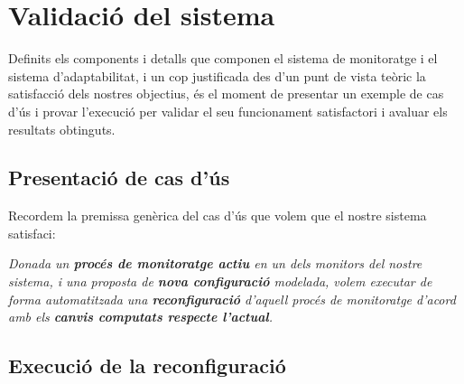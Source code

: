 
\chapter{Validació del sistema} %

Definits els components i detalls que componen el sistema de monitoratge i el sistema d'adaptabilitat, i un cop justificada des d'un punt de vista teòric la satisfacció dels nostres objectius, és el moment de presentar un exemple de cas d'ús i provar l'execució per validar el seu funcionament satisfactori i avaluar els resultats obtinguts.

\section{Presentació de cas d'ús}

Recordem la premissa genèrica del cas d'ús que volem que el nostre sistema satisfaci:

\begin{center}
\textit{Donada un \textbf{procés de monitoratge actiu} en un dels monitors del nostre sistema, i una proposta de \textbf{nova configuració} modelada, volem executar de forma automatitzada una \textbf{reconfiguració} d'aquell procés de monitoratge d'acord amb els \textbf{canvis computats respecte l'actual}.}
\end{center}



\section{Execució de la reconfiguració}